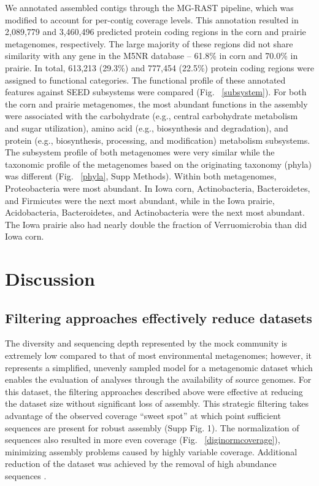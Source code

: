 \documentclass[11pt]{article} %
\begin{document}
We annotated assembled contigs through the MG-RAST pipeline, which
was modified to account for per-contig coverage levels.
This annotation resulted in 2,089,779 and 3,460,496 predicted protein
coding regions in the corn and prairie metagenomes, respectively.  The
large majority of these regions did not share similarity with any gene
in the M5NR database -- 61.8\% in corn and
70.0\% in prairie.  In total, 613,213 (29.3\%) and 777,454 (22.5\%)
protein coding regions were assigned to functional categories.  The
functional profile of these annotated features against SEED subsystems
were compared (Fig. ~\ref{subsystem}).  For both the corn and prairie
metagenomes, the most abundant functions in the assembly were
associated with the carbohydrate (e.g., central carbohydrate
metabolism and sugar utilization), amino acid (e.g., biosynthesis and
degradation), and protein (e.g., biosynthesis, processing, and
modification) metabolism subsystems.  The subsystem profile of both
metagenomes were very similar while the taxonomic profile of the
metagenomes based on the originating taxonomy (phyla) was different
(Fig. ~\ref{phyla}, Supp Methods).  Within both metagenomes,
Proteobacteria were most abundant.  In Iowa
corn, Actinobacteria, Bacteroidetes, and Firmicutes were
the next most abundant, while in the Iowa prairie, Acidobacteria,
Bacteroidetes, and Actinobacteria were the next most abundant.
The Iowa prairie also had nearly double the fraction
of Verruomicrobia than did Iowa corn.


\section{Discussion}

\subsection{Filtering approaches effectively reduce datasets} 

The diversity and sequencing depth represented by the mock community
is extremely low compared to that of most environmental metagenomes;
however, it represents a simplified, unevenly sampled model for a
metagenomic dataset which enables the evaluation of analyses through
the availability of source genomes.  For this dataset, the filtering
approaches described above were effective at reducing the dataset size
without significant loss of assembly.  This strategic filtering takes
advantage of the observed coverage ``sweet spot'' at which point
sufficient sequences are present for robust assembly (Supp Fig. 1).  
The normalization of sequences also resulted in
more even coverage (Fig. ~\ref{diginormcoverage}),
minimizing assembly problems caused by highly variable coverage.
Additional reduction of the dataset was achieved by the removal of
high abundance sequences \cite{howeartifacts}.
\end{document}
